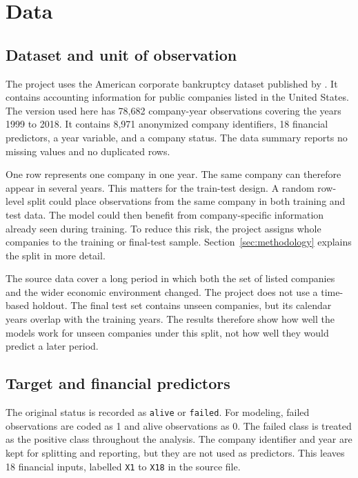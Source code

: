 \documentclass[11pt,a4paper]{article}
\begin{document}
\section{Data}
\label{sec:data}

\subsection{Dataset and unit of observation}

The project uses the American corporate bankruptcy dataset published by
\citet{lombardo2022}. It contains accounting information for public companies
listed in the United States. The version used here has 78,682 company-year
observations covering the years 1999 to 2018. It contains 8,971 anonymized
company identifiers, 18 financial predictors, a year variable, and a company
status. The data summary reports no missing values and no duplicated rows.

One row represents one company in one year. The same company can therefore
appear in several years. This matters for the train-test design. A random
row-level split could place observations from the same company in both training
and test data. The model could then benefit from company-specific information
already seen during training. To reduce this risk, the project assigns whole
companies to the training or final-test sample. Section~\ref{sec:methodology}
explains the split in more detail.

The source data cover a long period in which both the set of listed companies
and the wider economic environment changed. The project does not use a
time-based holdout. The final test set contains unseen companies, but its
calendar years overlap with the training years. The results therefore show how
well the models work for unseen companies under this split, not how well they
would predict a later period.

\subsection{Target and financial predictors}

The original status is recorded as \texttt{alive} or \texttt{failed}. For
modeling, failed observations are coded as 1 and alive observations as 0. The
failed class is treated as the positive class throughout the analysis. The
company identifier and year are kept for splitting and reporting, but they are
not used as predictors. This leaves 18 financial inputs, labelled \texttt{X1}
to \texttt{X18} in the source file.
\end{document}
